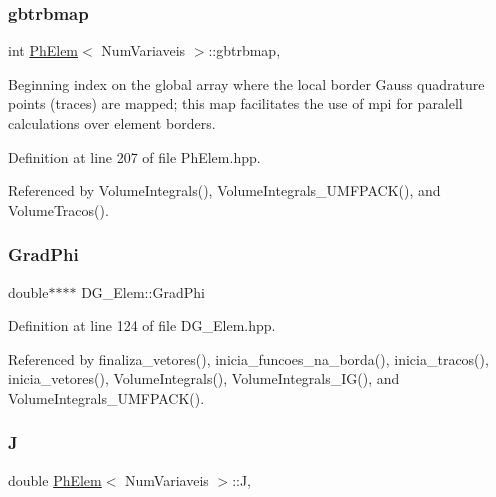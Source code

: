 \subsubsection{\texorpdfstring{gbtrbmap}{gbtrbmap}}
{\footnotesize\ttfamily int \hyperlink{classPhElem}{Ph\+Elem}$<$ Num\+Variaveis $>$\+::gbtrbmap\hspace{0.3cm}{\ttfamily [protected]}, {\ttfamily [inherited]}}



Beginning index on the global array where the local border Gauss quadrature points (traces) are mapped; this map facilitates the use of mpi for paralell calculations over element borders. 



Definition at line 207 of file Ph\+Elem.\+hpp.



Referenced by Volume\+Integrals(), Volume\+Integrals\+\_\+\+U\+M\+F\+P\+A\+C\+K(), and Volume\+Tracos().

\mbox{\label{classDG__Elem_a89a6e65d3cca9d70aff0af308e1c4828}} 
\subsubsection{\texorpdfstring{Grad\+Phi}{GradPhi}}
{\footnotesize\ttfamily double$\ast$$\ast$$\ast$$\ast$ D\+G\+\_\+\+Elem\+::\+Grad\+Phi\hspace{0.3cm}{\ttfamily [private]}}



Definition at line 124 of file D\+G\+\_\+\+Elem.\+hpp.



Referenced by finaliza\+\_\+vetores(), inicia\+\_\+funcoes\+\_\+na\+\_\+borda(), inicia\+\_\+tracos(), inicia\+\_\+vetores(), Volume\+Integrals(), Volume\+Integrals\+\_\+\+I\+G(), and Volume\+Integrals\+\_\+\+U\+M\+F\+P\+A\+C\+K().

\mbox{\label{classPhElem_a27acf6bc6ac9eaf94a7cce52522b3b92}} 
\subsubsection{\texorpdfstring{J}{J}}
{\footnotesize\ttfamily double \hyperlink{classPhElem}{Ph\+Elem}$<$ Num\+Variaveis $>$\+::J\hspace{0.3cm}{\ttfamily [protected]}, {\ttfamily [inherited]}}



